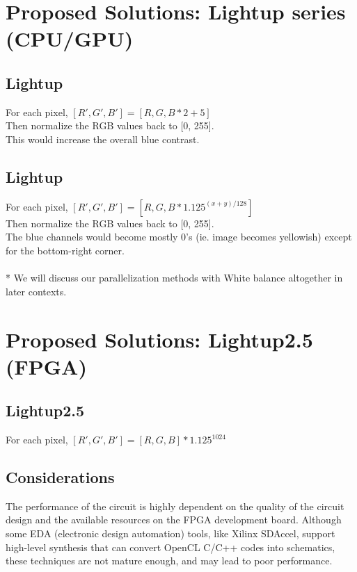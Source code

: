 \documentclass{acm_proc_article-sp}
\begin{document}
\section{Proposed Solutions: Lightup series (CPU/GPU)}
\subsection{Lightup}
For each pixel, \([R', G', B'] = [R, G, B * 2 + 5] \) \\
Then normalize the RGB values back to [0, 255]. \\
This would increase the overall blue contrast.
\subsection{Lightup}
For each pixel, \([R', G', B'] = [R, G, B * 1.125^{(x + y) / 128}]\) \\
Then normalize the RGB values back to [0, 255]. \\
The blue channels would become mostly 0's (ie. image becomes yellowish) except for the bottom-right corner. \\
\\
* We will discuss our parallelization methods with White balance altogether in later contexts.

\section{Proposed Solutions: Lightup2.5 (FPGA)}
\subsection{Lightup2.5}
For each pixel, \([R', G', B'] = [R, G, B] * 1.125^{1024}\)
\subsection{Considerations}
The performance of the circuit is highly dependent on the quality of the circuit design and the available resources on the FPGA development board. Although some EDA (electronic design automation) tools, like Xilinx SDAccel, support high-level synthesis that can convert OpenCL C/C++ codes into schematics, these techniques are not mature enough, and may lead to poor performance.
\end{document}
